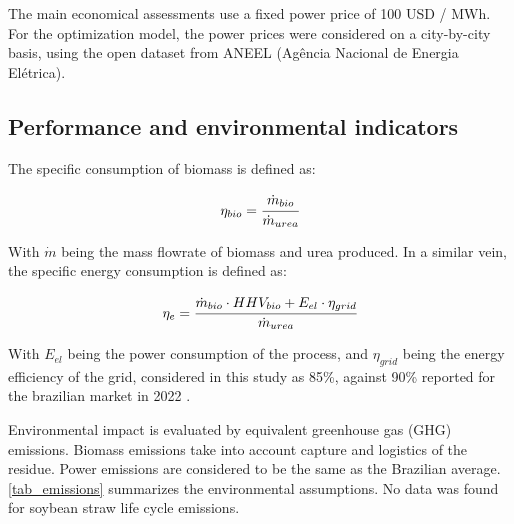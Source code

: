 \documentclass[a4paper, titlepage]{article}
\begin{document}
The main economical assessments use a fixed power price of 100 USD / MWh. For the optimization model, the power prices
were considered on a city-by-city basis, using the open dataset from ANEEL (Agência Nacional de Energia Elétrica). 
\cite{ANEELPortalReports}

\subsection{Performance and environmental indicators}

The specific consumption of biomass is defined as:

\begin{equation}
	\eta_{bio} = \cfrac{\dot m_{bio}}{\dot m_{urea}}
\end{equation}

With $\dot m$ being the mass flowrate of biomass and urea produced. In a similar vein, the specific energy consumption
is defined as:

\begin{equation}
	\eta _e = \cfrac{\dot m_{bio} \cdot HHV_{bio} + E_{el} \cdot \eta _{grid}}{\dot m_{urea}}
\end{equation}

With $E_{el}$ being the power consumption of the process, and $\eta _{grid}$ being the energy efficiency of the grid,
considered in this study as 85\%, against 90\% reported for the brazilian market in 2022
\cite{epeBENBalancoEnergetico2023}.

Environmental impact is evaluated by equivalent greenhouse gas (GHG) emissions. Biomass emissions take into account
capture and logistics of the residue. Power emissions are considered to be the same as the Brazilian average.
\autoref{tab_emissions} summarizes the environmental assumptions. No data was found for soybean straw life cycle emissions.
\end{document}
